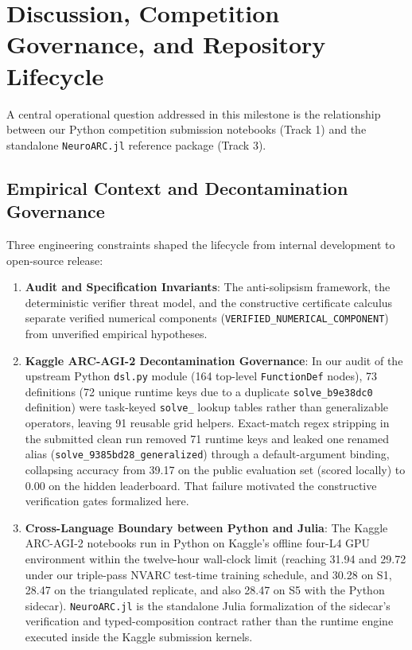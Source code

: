 \section{Discussion, Competition Governance, and Repository Lifecycle}

A central operational question addressed in this milestone is the relationship between our Python competition submission notebooks (Track 1) and the standalone \texttt{NeuroARC.jl} reference package (Track 3).

\subsection{Empirical Context and Decontamination Governance}
Three engineering constraints shaped the lifecycle from internal development to open-source release:

\begin{enumerate}
  \item \textbf{Audit and Specification Invariants}: The anti-solipsism framework, the deterministic verifier threat model, and the constructive certificate calculus separate verified numerical components (\texttt{VERIFIED\_NUMERICAL\_COMPONENT}) from unverified empirical hypotheses.
  \item \textbf{Kaggle ARC-AGI-2 Decontamination Governance}: In our audit of the upstream Python \texttt{dsl.py} module (164 top-level \texttt{FunctionDef} nodes), 73 definitions (72 unique runtime keys due to a duplicate \texttt{solve\_b9e38dc0} definition) were task-keyed \texttt{solve\_<8hex>} lookup tables rather than generalizable operators, leaving 91 reusable grid helpers. Exact-match regex stripping in the submitted clean run removed 71 runtime keys and leaked one renamed alias (\texttt{solve\_9385bd28\_generalized}) through a default-argument binding, collapsing accuracy from 39.17 on the public evaluation set (scored locally) to 0.00 on the hidden leaderboard. That failure motivated the constructive verification gates formalized here.
  \item \textbf{Cross-Language Boundary between Python and Julia}: The Kaggle ARC-AGI-2 notebooks run in Python on Kaggle's offline four-L4 GPU environment within the twelve-hour wall-clock limit (reaching 31.94 and 29.72 under our triple-pass NVARC test-time training schedule, and 30.28 on S1, 28.47 on the triangulated replicate, and also 28.47 on S5 with the Python sidecar). \texttt{NeuroARC.jl} is the standalone Julia formalization of the sidecar's verification and typed-composition contract rather than the runtime engine executed inside the Kaggle submission kernels.
\end{enumerate}


